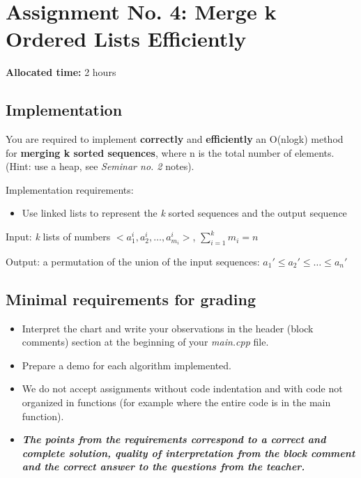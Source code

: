\documentclass[../en-fa-lab.tex]{subfiles}
\begin{document}
\section{\texorpdfstring{\textbf{Assignment No. 4: Merge k Ordered Lists Efficiently}}{Assignment No. 4: Merge k Ordered Lists Efficiently}}\label{assign4}

\textbf{Allocated time:} 2 hours

\subsection{Implementation}\label{implementation}

You are required to implement \textbf{correctly} and
\textbf{efficiently} an O(nlogk) method for \textbf{merging k sorted
sequences}, where n is the total number of elements. (Hint: use a heap,
see \emph{Seminar no. 2} notes).

Implementation requirements:

\begin{itemize}
\item
  Use linked lists to represent the \emph{k} sorted sequences and the
  output sequence
\end{itemize}

Input: \emph{k} lists of numbers
\(< a_{1}^{i},a_{2}^{i},\ldots,a_{m_{i}}^{i} >\),
\(\sum_{i = 1}^{k}m_{i} = n\)

Output: a permutation of the union of the input sequences:
\(a_{1}' \leq a_{2}' \leq \ldots \leq a_{n}'\)

\subsection{Minimal requirements for
grading}\label{minimal-requirements-for-grading}

\begin{itemize}
\item
  Interpret the chart and write your observations in the header (block
  comments) section at the beginning of your \emph{main.cpp} file.
\end{itemize}

\begin{itemize}
\item
  Prepare a demo for each algorithm implemented.
\item
  We do not accept assignments without code indentation and with code
  not organized in functions (for example where the entire code is in
  the main function).
\item
  \emph{\textbf{The points from the requirements correspond to a correct
  and complete solution, quality of interpretation from the block
  comment and the correct answer to the questions from the teacher.}}
\end{itemize}
\end{document}
